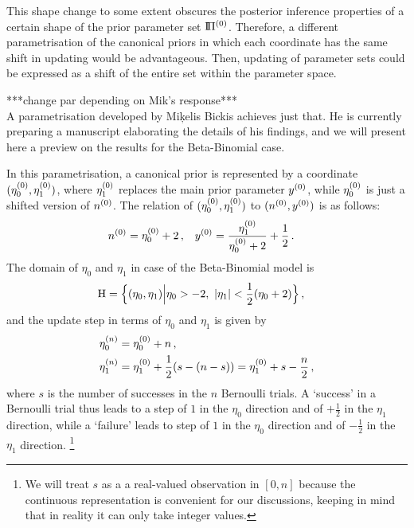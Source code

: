 This shape change to some extent obscures the posterior inference properties
of a certain shape of the prior parameter set $\text{I}\!\Pi^{(0)}$.
Therefore, a different parametrisation of the canonical priors
in which each coordinate has the same shift in updating would be advantageous.
Then, updating of parameter sets
could be expressed as a shift of the entire set within the parameter space.

***change par depending on Mik's response***\\
A parametrisation developed by Mi\c{k}elis Bickis \cite[personal communication]{2011:bickis:geomip} achieves just that.
He is currently preparing a manuscript elaborating the details of his findings,
and we will present here a preview on the results for the Beta-Binomial case.

In this parametrisation, a canonical prior is represented by a coordinate $(\eta_0^{(0)},\eta_1^{(0)})$,
where $\eta_1^{(0)}$ replaces the main prior parameter $y^{(0)}$,
while $\eta_0^{(0)}$ is just a shifted version of $n^{(0)}$.
The relation of $(\eta_0^{(0)},\eta_1^{(0)})$ to $(n^{(0)}, y^{(0)})$ is as follows:
\begin{align}
\label{eq:trafotony}
n^{(0)} &= \eta_0^{(0)} + 2\,, &
y^{(0)} &= \frac{\eta_1^{(0)}}{\eta_0^{(0)} + 2} + \frac{1}{2}\,.
\end{align}
The domain of $\eta_0$ and $\eta_1$ in case of the Beta-Binomial model is
\begin{align}
\label{eq:eta-domain}
\mathrm{H} &= \Big\{ (\eta_0,\eta_1) \Big| \eta_0 > -2,\ |\eta_1| < \frac{1}{2}(\eta_0 + 2) \Big.\Big\}\,,
\end{align}
and the update step in terms of $\eta_0$ and $\eta_1$ is given by
\begin{equation}
\label{eq:eta-update}
\begin{aligned}
\eta_0^{(n)} &= \eta_0^{(0)} + n\,, \\
\eta_1^{(n)} &= \eta_1^{(0)} + \frac{1}{2}(s - (n-s)) = \eta_1^{(0)} + s - \frac{n}{2}\,,
\end{aligned}
\end{equation}
where $s$ is the number of successes in the $n$ Bernoulli trials.
A `success' in a Bernoulli trial thus
leads to a step of $1$ in the $\eta_0$ direction and of $+\frac{1}{2}$ in the $\eta_1$ direction,
while a `failure'
leads to step of $1$ in the $\eta_0$ direction and of $-\frac{1}{2}$ in the $\eta_1$ direction.%
\footnote{We will treat $s$ as a a real-valued observation in $[0,n]$
because the continuous representation is convenient for our discussions,
keeping in mind that in reality it can only take integer values.}

